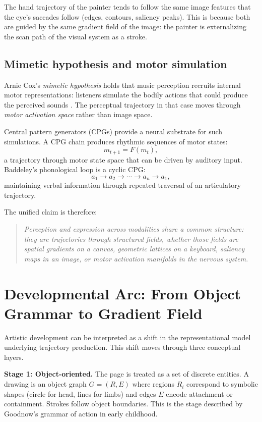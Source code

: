 \documentclass[12pt,a4paper]{article}
\theoremstyle{plain}
\theoremstyle{definition}
\begin{document}
The hand trajectory of the painter tends to follow the same image features that
the eye's saccades follow (edges, contours, saliency peaks). This is because both
are guided by the same gradient field of the image: the painter is externalizing
the scan path of the visual system as a stroke.

\subsection{Mimetic hypothesis and motor simulation}

Arnie Cox's \emph{mimetic hypothesis} holds that music perception recruits
internal motor representations: listeners simulate the bodily actions that could
produce the perceived sounds \cite{cox2016}. The perceptual trajectory in that
case moves through \emph{motor activation space} rather than image space.

Central pattern generators (CPGs) provide a neural substrate for such
simulations. A CPG chain produces rhythmic sequences of motor states:
\[
m_{t+1} = F(m_t),
\]
a trajectory through motor state space that can be driven by auditory input.
Baddeley's phonological loop is a cyclic CPG:
\[
a_1 \to a_2 \to \cdots \to a_n \to a_1,
\]
maintaining verbal information through repeated traversal of an articulatory
trajectory.

The unified claim is therefore:

\begin{quote}
\emph{Perception and expression across modalities share a common structure:
they are trajectories through structured fields, whether those fields are
spatial gradients on a canvas, geometric lattices on a keyboard, saliency maps
in an image, or motor activation manifolds in the nervous system.}
\end{quote}

\section{Developmental Arc: From Object Grammar to Gradient Field}
\label{sec:developmental}

Artistic development can be interpreted as a shift in the representational model
underlying trajectory production. This shift moves through three conceptual
layers.

\textbf{Stage 1: Object-oriented.} The page is treated as a set of discrete
entities. A drawing is an object graph $G = (R,E)$ where regions $R_i$
correspond to symbolic shapes (circle for head, lines for limbs) and edges $E$
encode attachment or containment. Strokes follow object boundaries. This is the
stage described by Goodnow's grammar of action in early childhood.
\end{document}
